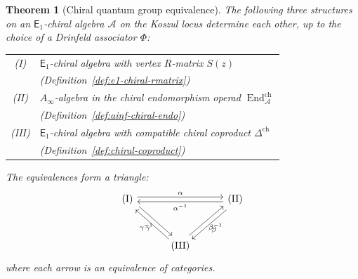 \documentclass[11pt,reqno]{amsart}
\newtheorem{theorem}{Theorem}[section]
\theoremstyle{definition}
\theoremstyle{remark}
\newcommand{\cA}{\mathcal{A}}
\newcommand{\Ainf}{A_{\infty}}
\newcommand{\Eone}{\mathsf{E}_{1}}
\DeclareMathOperator{\End}{End}
\numberwithin{equation}{section}
\begin{document}
\begin{theorem}[Chiral quantum group equivalence]
\label{thm:chiral-qg-equiv}
The following three structures on an $\Eone$-chiral
algebra $\cA$ on the Koszul locus determine each other,
up to the choice of a Drinfeld associator $\Phi$:
\begin{center}
\renewcommand{\arraystretch}{1.3}
\begin{tabular}{cl}
\textup{(I)} & $\Eone$-chiral algebra with vertex
  $R$-matrix $S(z)$ \\
  & \textup{(}Definition~\textup{\ref{def:e1-chiral-rmatrix}}\textup{)} \\
\textup{(II)} & $\Ainf$-algebra in the chiral endomorphism
  operad $\End^{\mathrm{ch}}_\cA$ \\
  & \textup{(}Definition~\textup{\ref{def:ainf-chiral-endo}}\textup{)} \\
\textup{(III)} & $\Eone$-chiral algebra with compatible
  chiral coproduct $\Delta^{\mathrm{ch}}$ \\
  & \textup{(}Definition~\textup{\ref{def:chiral-coproduct}}\textup{)}
\end{tabular}
\end{center}
The equivalences form a triangle:
\begin{equation}\label{eq:equiv-triangle}
\begin{tikzcd}[column sep=3em, row sep=3em]
  \textup{(I)} \ar[rr, shift left=1, "\alpha"]
  \ar[dr, shift left=1, "\gamma^{-1}"']
  && \textup{(II)} \ar[ll, shift left=1, "\alpha^{-1}"]
  \ar[dl, shift left=1, "\beta"] \\
  & \textup{(III)}
  \ar[ul, shift left=1, "\gamma"]
  \ar[ur, shift left=1, "\beta^{-1}"']
\end{tikzcd}
\end{equation}
where each arrow is an equivalence of categories.
\end{theorem}
\end{document}
